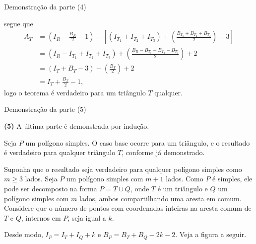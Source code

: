 \begin{frame}[fragile]{Demonstração da parte (4)}

    segue que
    \begin{align*}
        A_T &= \left( I_R - \frac{B_R}{2} - 1\right) - \left[
        \left( I_{T_1} + I_{T_2} + I_{T_3} \right) +
        \left( \frac{B_{T_1} + B_{T_2} + B_{T_3}}{2}\right) - 3\right] \\
        &= \left(I_R - I_{T_1} + I_{T_2} + I_{T_3} \right) +
        \left( \frac{B_R - B_{T_1} - B_{T_2} - B_{T_3}}{2}\right) + 2\\
        &= \left(I_T + B_T - 3 \right) -
        \left( \frac{B_T}{2}\right) + 2\\
        &= I_T + \frac{B_T}{2} - 1,
    \end{align*}
    logo o teorema é verdadeiro para um triângulo $T$ qualquer.

\end{frame}

\begin{frame}[fragile]{Demonstração da parte (5)}

    \textbf{(5)} A última parte é demonstrada por indução. 
    \pause

    Seja $P$ um polígono simples. O caso base ocorre para um triângulo, e o resultado é 
    verdadeiro para qualquer triângulo $T$, conforme já demonstrado.
    \pause

    Suponha que o resultado seja verdadeiro para qualquer polígono simples como $m\geq 3$ lados.
    Seja $P$ um polígono simples com $m + 1$ lados. Como $P$ é simples, ele pode ser 
        decomposto na forma $P = T\cup Q$, onde $T$ é um triângulo e $Q$ um polígono simples
        com $m$ lados, ambos compartilhando uma aresta em comum. Considere que o número de
        pontos com coordenadas inteiras na aresta comum de $T$ e $Q$, internos em $P$, seja igual a $k$.
    \pause

    Desde modo, $I_P = I_T + I_Q + k$ e $B_P = B_T + B_Q - 2k - 2$. Veja a figura a seguir.

\end{frame}

